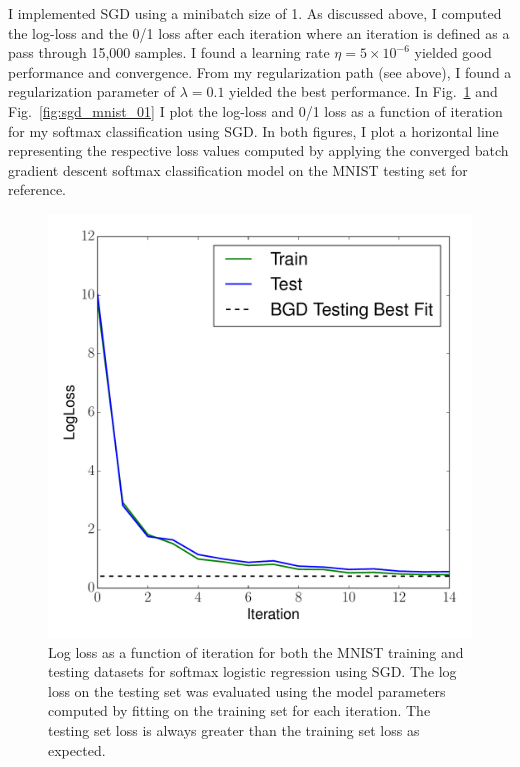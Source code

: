 \documentclass[12pt]{amsart}
\begin{document}
I implemented SGD using a minibatch size of 1.  As discussed above, I computed the log-loss and the 0/1 loss after each iteration where an iteration is defined as a pass through 15,000 samples.  I found a learning rate $\eta = 5 \times 10^{-6}$ yielded good performance and convergence.  From my regularization path (see above), I found a regularization parameter of $\lambda = 0.1$ yielded the best performance.  In Fig.~\ref{fig:sgd_mnist_ll} and Fig.~\ref{fig:sgd_mnist_01} I plot the log-loss and 0/1 loss as a function of iteration for my softmax classification using SGD.  In both figures, I plot a horizontal line representing the respective loss values computed by applying the converged batch gradient descent softmax classification model on the MNIST testing set for reference.

\begin{figure}[H]
	\includegraphics[width=\columnwidth]{sgd_mnist_multi_train_test_ll.pdf}
    \caption{Log loss as a function of iteration for both the MNIST training and testing datasets for softmax logistic regression using SGD.  The log loss on the testing set was evaluated using the model parameters computed by fitting on the training set for each iteration.  The testing set loss is always greater than the training set loss as expected.}
    \label{fig:sgd_mnist_ll}
\end{figure}
\end{document}
